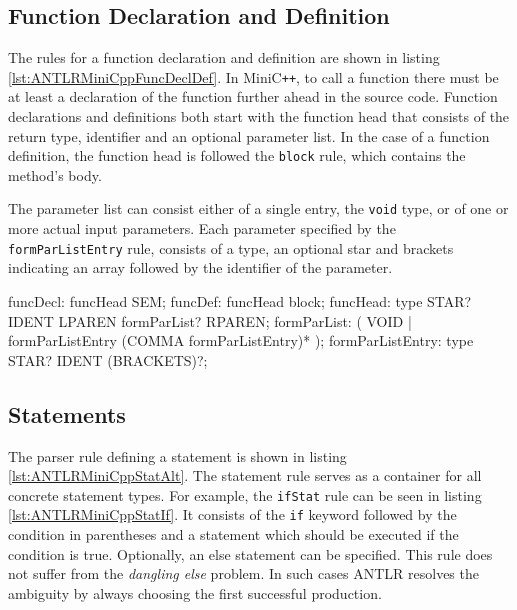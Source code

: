 \subsection{Function Declaration and Definition}

The rules for a function declaration and definition are shown in listing \ref{lst:ANTLRMiniCppFuncDeclDef}. In MiniC\verb|++|, to call a function there must be at least a declaration of the function further ahead in the source code. Function declarations and definitions both start with the function head that consists of the return type, identifier and an optional parameter list. In the case of a function definition, the function head is followed the \texttt{block} rule, which contains the method's body. 

The parameter list can consist either of a single entry, the \texttt{void} type, or of one or more actual input parameters. Each parameter specified by the \texttt{formParListEntry} rule, consists of a type, an optional star and brackets indicating an array followed by the identifier of the parameter.


\begin{AntlrCode}[float,numbers=none,caption=Function declaration and defintion of the MiniC++ ANTLR grammar., label=lst:ANTLRMiniCppFuncDeclDef]
funcDecl:         funcHead SEM;
funcDef:          funcHead block;
funcHead:         type STAR? IDENT LPAREN formParList? RPAREN;
formParList:      (     VOID
                  |     formParListEntry (COMMA formParListEntry)*
                  );
formParListEntry: type STAR? IDENT (BRACKETS)?;
\end{AntlrCode}

\subsection{Statements}

The parser rule defining a statement is shown in listing \ref{lst:ANTLRMiniCppStatAlt}. The statement rule serves as a container for all concrete statement types. For example, the \texttt{ifStat} rule can be seen in listing \ref{lst:ANTLRMiniCppStatIf}. It consists of the \texttt{if} keyword followed by the condition in parentheses and a statement which should be executed if the condition is true. Optionally, an else statement can be specified. This rule does not suffer from the \textit{dangling else} problem. In such cases ANTLR resolves the ambiguity by always choosing the first successful production. 

